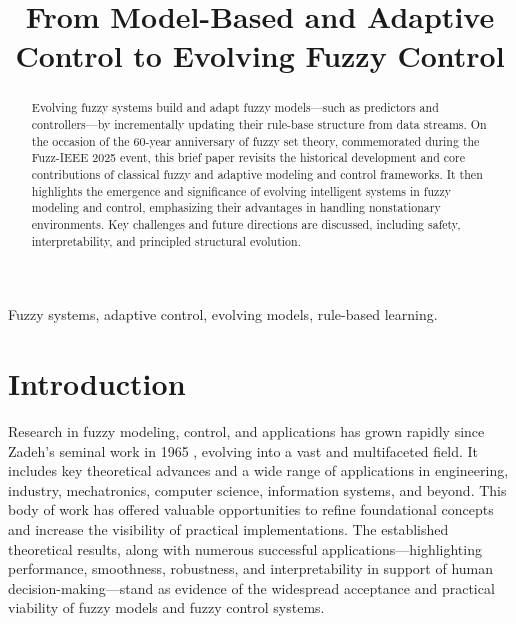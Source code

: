 \documentclass[conference]{IEEEtran}
\begin{document}
\title{From Model-Based and Adaptive Control to Evolving Fuzzy Control}

\author{
\and
{}
\and
{}
}

\maketitle

\begin{abstract}

Evolving fuzzy systems build and adapt fuzzy models—such as predictors and controllers—by incrementally updating their rule-base structure from data streams. On the occasion of the 60-year anniversary of fuzzy set theory, commemorated during the Fuzz-IEEE 2025 event, this brief paper revisits the historical development and core contributions of classical fuzzy and adaptive modeling and control frameworks. It then highlights the emergence and significance of evolving intelligent systems in fuzzy modeling and control, emphasizing their advantages in handling nonstationary environments. Key challenges and future directions are discussed, including safety, interpretability, and principled structural evolution.

\end{abstract}

\begin{IEEEkeywords}
Fuzzy systems, adaptive control, evolving models, rule-based learning.
\end{IEEEkeywords}

\section{Introduction}

Research in fuzzy modeling, control, and applications has grown rapidly since Zadeh's seminal work in 1965 \cite{zadeh1965}, evolving into a vast and multifaceted field. It includes key theoretical advances and a wide range of applications in engineering, industry, mechatronics, computer science, information systems, and beyond. This body of work has offered valuable opportunities to refine foundational concepts and increase the visibility of practical implementations. The established theoretical results, along with numerous successful applications—highlighting performance, smoothness, robustness, and interpretability in support of human decision-making—stand as evidence of the widespread acceptance and practical viability of fuzzy models and fuzzy control systems.
\end{document}
